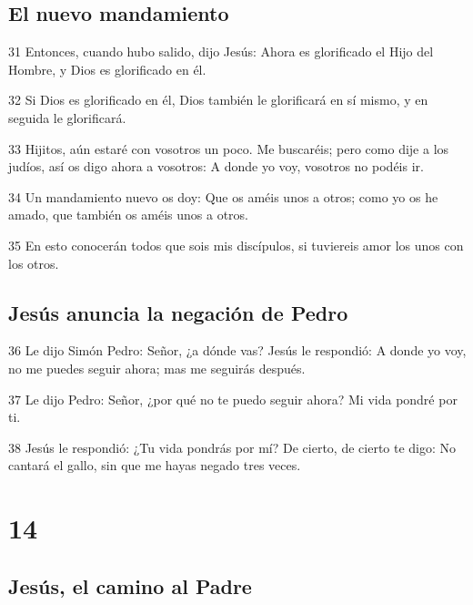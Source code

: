 \section*{El nuevo mandamiento}

\par 31 Entonces, cuando hubo salido, dijo Jesús: Ahora es glorificado el Hijo del Hombre, y Dios es glorificado en él.
\par 32 Si Dios es glorificado en él, Dios también le glorificará en sí mismo, y en seguida le glorificará.
\par 33 Hijitos, aún estaré con vosotros un poco. Me buscaréis; pero como dije a los judíos, así os digo ahora a vosotros: A donde yo voy, vosotros no podéis ir.
\par 34 Un mandamiento nuevo os doy: Que os améis unos a otros; como yo os he amado, que también os améis unos a otros.
\par 35 En esto conocerán todos que sois mis discípulos, si tuviereis amor los unos con los otros.

\section*{Jesús anuncia la negación de Pedro}

\par 36 Le dijo Simón Pedro: Señor, ¿a dónde vas? Jesús le respondió: A donde yo voy, no me puedes seguir ahora; mas me seguirás después.
\par 37 Le dijo Pedro: Señor, ¿por qué no te puedo seguir ahora? Mi vida pondré por ti.
\par 38 Jesús le respondió: ¿Tu vida pondrás por mí? De cierto, de cierto te digo: No cantará el gallo, sin que me hayas negado tres veces.

\chapter{14}

\section*{Jesús, el camino al Padre}

